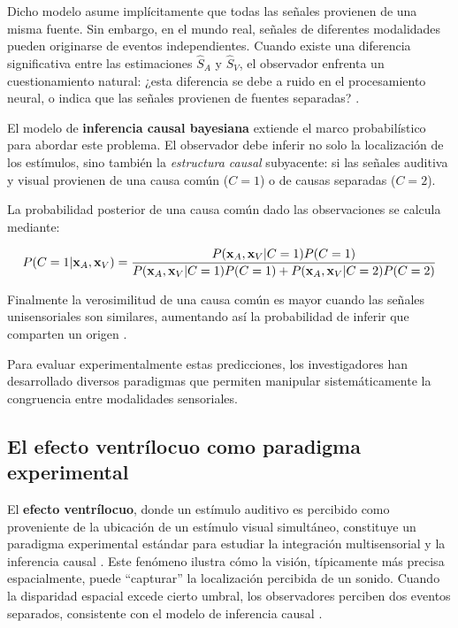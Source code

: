Dicho modelo asume implícitamente que todas las señales provienen de una misma fuente. Sin embargo, en el mundo real, señales de diferentes modalidades pueden originarse de eventos independientes. Cuando existe una diferencia significativa entre las estimaciones $\hat{S}_A$ y $\hat{S}_V$, el observador enfrenta un cuestionamiento natural: ¿esta diferencia se debe a ruido en el procesamiento neural, o indica que las señales provienen de fuentes separadas? \citep{paredes2025scikit}.

El modelo de \textbf{inferencia causal bayesiana} \citep{kording2007causal} extiende el marco probabilístico para abordar este problema. El observador debe inferir no solo la localización de los estímulos, sino también la \textit{estructura causal} subyacente: si las señales auditiva y visual provienen de una causa común ($C=1$) o de causas separadas ($C=2$).

La probabilidad posterior de una causa común dado las observaciones se calcula mediante:

\begin{equation} \notag
P(C=1|\mathbf{x}_A, \mathbf{x}_V) = \frac{P(\mathbf{x}_A, \mathbf{x}_V|C=1)P(C=1)}{P(\mathbf{x}_A, \mathbf{x}_V|C=1)P(C=1) + P(\mathbf{x}_A, \mathbf{x}_V|C=2)P(C=2)}
\label{eq:causal_inference}
\end{equation}

Finalmente la verosimilitud de una causa común es mayor cuando las señales unisensoriales son similares, aumentando así la probabilidad de inferir que comparten un origen \citep{paredes2025scikit}.

Para evaluar experimentalmente estas predicciones, los investigadores han desarrollado diversos paradigmas que permiten manipular sistemáticamente la congruencia entre modalidades sensoriales.

\subsection{El efecto ventrílocuo como paradigma experimental}
\label{subsec:ventriloquismo}

El \textbf{efecto ventrílocuo}, donde un estímulo auditivo es percibido como proveniente de la ubicación de un estímulo visual simultáneo, constituye un paradigma experimental estándar para estudiar la integración multisensorial y la inferencia causal \citep{alais2004ventriloquist}. Este fenómeno ilustra cómo la visión, típicamente más precisa espacialmente, puede ``capturar'' la localización percibida de un sonido. Cuando la disparidad espacial excede cierto umbral, los observadores perciben dos eventos separados, consistente con el modelo de inferencia causal \citep{kording2007causal}.


